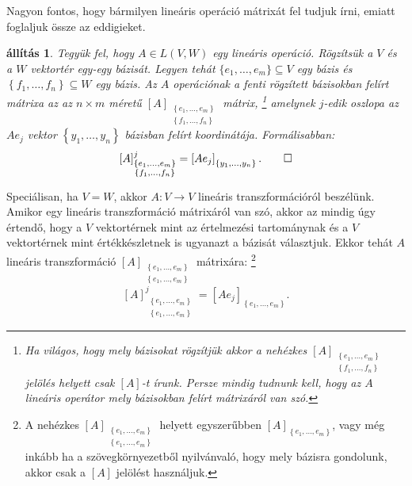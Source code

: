 \documentclass[9pt, a4paper, showtrims]{memoir}
\theoremstyle{plain}
\newtheorem{proposition}{állítás}[chapter]
\theoremstyle{remark}
\theoremstyle{definition}
\begin{document}
Nagyon fontos, hogy bármilyen lineáris operáció mátrixát fel tudjuk írni, 
emiatt foglaljuk össze az eddigieket.
\begin{proposition}
	Tegyük fel, hogy $A\in L\left( V,W \right)$ egy lineáris operáció.
	Rögzítsük a $V$ és a $W$ vektortér egy-egy bázisát.
	Legyen tehát $\{e_1,\ldots,e_m\}\subseteq V$ egy bázis és
	$\left\{ f_1,\ldots,f_n \right\}\subseteq W$ egy bázis.
	Az $A$ operációnak a fenti rögzített bázisokban felírt mátrixa az az
	$n\times m$ méretű
	$[A]_{\substack{\left\{ e_1,\ldots,e_m \right\}\\ \left\{ f_1,\ldots,f_n \right\}}}$
	mátrix,
	\footnote{Ha világos, hogy mely bázisokat rögzítjük akkor a nehézkes
		$[A]_{\substack{\left\{ e_1,\ldots,e_m \right\}\\ \left\{ f_1,\ldots,f_n \right\}}}$
		jelölés helyett csak $[A]$-t írunk.
		Persze mindig tudnunk kell, hogy az $A$ lineáris operátor mely bázisokban felírt mátrixáról van szó.
	}
	amelynek $j$-edik oszlopa az $Ae_j$ vektor $\left\{ y_1,\ldots,y_n \right\}$ bázisban felírt koordinátája.
	Formálisabban:
	\[
		[A]_{\substack{\left\{ e_1,\ldots,e_m \right\}\\ \left\{ f_1,\ldots,f_n \right\}}}^j
		=
		\left[ Ae_j \right]_{\left\{ y_1,\ldots,y_n \right\}}.
		\qedhere
	\]
\end{proposition}
Speciálisan, ha $V=W$, akkor $A:V\to V$ lineáris transzformációról beszélünk.
Amikor egy lineáris transzformáció mátrixáról van szó,
akkor az mindig úgy értendő, hogy a $V$ vektortérnek mint az értelmezési tartománynak és a
$V$ vektortérnek mint értékkészletnek is ugyanazt a bázisát választjuk.
Ekkor tehát $A$ lineáris transzformáció
$[A]_{\substack{\left\{ e_1,\ldots,e_m \right\}\\ \left\{ e_1,\ldots,e_m \right\}}}$
mátrixára:
\footnote{
	A nehézkes
	$[A]_{\substack{\left\{ e_1,\ldots,e_m \right\}\\ \left\{ e_1,\ldots,e_m \right\}}}$
	helyett egyszerűbben
	$[A]_{\left\{ e_1,\ldots,e_m \right\}}$, vagy még inkább ha a szövegkörnyezetből nyilvánvaló, hogy mely bázisra gondolunk,
	akkor csak a $[A]$ jelölést használjuk.
}
\[
	[A]_{\substack{\left\{ e_1,\ldots,e_m \right\}\\ \left\{ e_1,\ldots,e_m \right\}}}^j
	=
	\left[ Ae_j \right]_{\left\{ e_1,\ldots,e_m \right\}}.
\]
\end{document}
